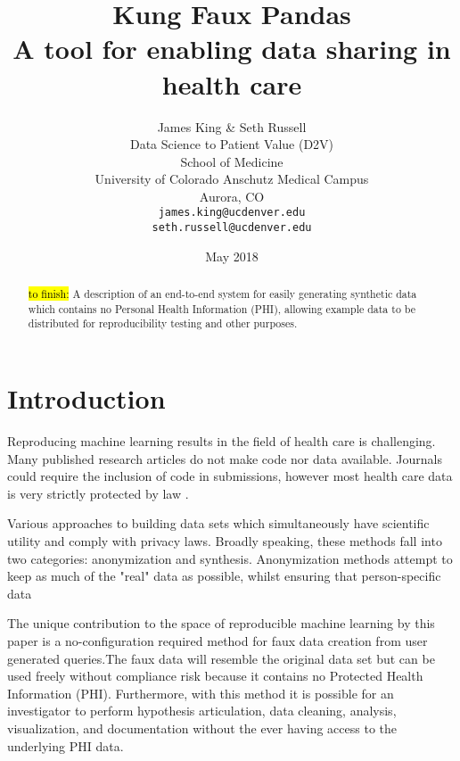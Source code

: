 \documentclass{article}
\title{%
  Kung Faux Pandas \\
  \large A tool for enabling data sharing in health care}
\author{
  James King \& Seth Russell\\
  Data Science to Patient Value (D2V)\\
  School of Medicine \\
  University of Colorado Anschutz Medical Campus\\
  Aurora, CO\\
  \texttt{james.king@ucdenver.edu} \\
  \texttt{seth.russell@ucdenver.edu} \\
  }
\date{May 2018}
\begin{document}

\maketitle

\begin{abstract}
\hl{to finish:} A description of an end-to-end system for easily generating synthetic data which contains no Personal Health Information (PHI), allowing example data to be distributed for reproducibility testing and other purposes.  

\end{abstract}



\section{Introduction}

Reproducing machine learning results in the field of health care is challenging. Many published research articles do not make code nor data available. Journals could require the inclusion of code in submissions, however most health care data is very strictly protected by law \cite{hippapro}.  

Various approaches to building data sets which simultaneously have scientific utility and comply with privacy laws.  Broadly speaking, these methods fall into two categories: anonymization and synthesis.  Anonymization methods attempt to keep as much of the "real" data as possible, whilst ensuring that person-specific data 

The unique contribution to the space of reproducible machine learning by this paper is a no-configuration required method for faux data creation from user generated queries.The faux data will resemble the original data set but can be used freely without compliance risk because it contains no Protected Health Information (PHI).  Furthermore, with this method it is possible for an investigator to perform hypothesis articulation, data cleaning, analysis, visualization, and documentation without the ever having access to the underlying PHI data.
\end{document}
